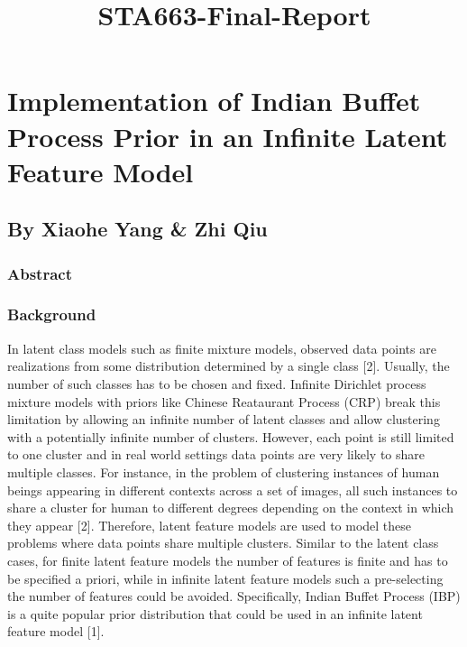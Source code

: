 \documentclass[11pt]{article}
\title{STA663-Final-Report}
\begin{document}
    
    
    \maketitle
    
    

    
    \hypertarget{implementation-of-indian-buffet-process-prior-in-an-infinite-latent-feature-model}{%
\section{Implementation of Indian Buffet Process Prior in an Infinite
Latent Feature
Model}\label{implementation-of-indian-buffet-process-prior-in-an-infinite-latent-feature-model}}

\hypertarget{by-xiaohe-yang-zhi-qiu}{%
\subsection{By Xiaohe Yang \& Zhi Qiu}\label{by-xiaohe-yang-zhi-qiu}}

    \hypertarget{abstract}{%
\subsubsection{Abstract}\label{abstract}}

    \hypertarget{background}{%
\subsubsection{Background}\label{background}}

    In latent class models such as finite mixture models, observed data
points are realizations from some distribution determined by a single
class {[}2{]}. Usually, the number of such classes has to be chosen and
fixed. Infinite Dirichlet process mixture models with priors like
Chinese Reataurant Process (CRP) break this limitation by allowing an
infinite number of latent classes and allow clustering with a
potentially infinite number of clusters. However, each point is still
limited to one cluster and in real world settings data points are very
likely to share multiple classes. For instance, in the problem of
clustering instances of human beings appearing in different contexts
across a set of images, all such instances to share a cluster for human
to different degrees depending on the context in which they appear
{[}2{]}. Therefore, latent feature models are used to model these
problems where data points share multiple clusters. Similar to the
latent class cases, for finite latent feature models the number of
features is finite and has to be specified a priori, while in infinite
latent feature models such a pre-selecting the number of features could
be avoided. Specifically, Indian Buffet Process (IBP) is a quite popular
prior distribution that could be used in an infinite latent feature
model {[}1{]}.
\end{document}
